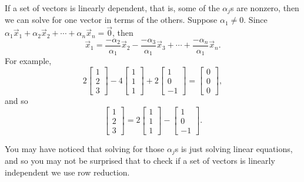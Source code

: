 If a set of vectors is linearly dependent, that is, some of the $\alpha_j$s
are nonzero, then we can solve for one vector in terms of the others.
Suppose $\alpha_1 \not= 0$.  Since
$\alpha_1 \vec{x}_1 + 
\alpha_2 \vec{x}_2 + 
\cdots +
\alpha_n \vec{x}_n 
=
\vec{0}$, then
\begin{equation*}
\vec{x}_1 
=
\frac{-\alpha_2}{\alpha_1}
\vec{x}_2 - 
\frac{-\alpha_3}{\alpha_1}
\vec{x}_3 + 
\cdots +
\frac{-\alpha_n}{\alpha_1}
\vec{x}_n .
\end{equation*}
For example,
\begin{equation*}
2
\begin{bmatrix} 1 \\ 2 \\ 3 \end{bmatrix}
-4
\begin{bmatrix} 1 \\ 1 \\ 1 \end{bmatrix}
+
2 \begin{bmatrix} 1 \\ 0 \\ -1 \end{bmatrix}
=
\begin{bmatrix} 0 \\ 0 \\ 0 \end{bmatrix} ,
\end{equation*}
and so
\begin{equation*}
\begin{bmatrix} 1 \\ 2 \\ 3 \end{bmatrix}
=
2
\begin{bmatrix} 1 \\ 1 \\ 1 \end{bmatrix}
-
\begin{bmatrix} 1 \\ 0 \\ -1 \end{bmatrix} .
\end{equation*}

You may have noticed that solving for those $\alpha_j$s is just solving
linear equations, and so you may not be surprised that to check
if a set of vectors is linearly independent we use row reduction.

